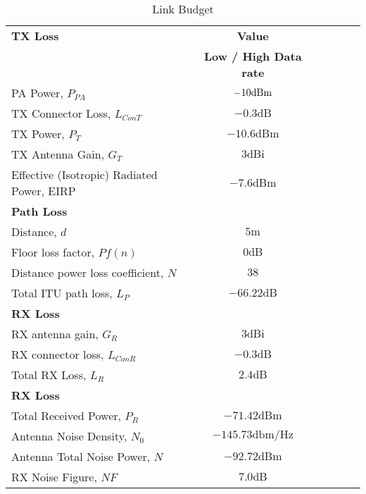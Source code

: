 \begin{table}[htbp]
  \centering
  \caption{Link Budget}
    \begin{tabular}{lccccr}
    \rowcolor[rgb]{ 0,  0,  0} \textcolor[rgb]{ 1,  1,  1}{\textbf{TX Loss}}	& \textcolor[rgb]{ 1,  1,  1}{\textbf{Value}} 		\\
    \rowcolor[rgb]{ 0,  0,  0} \textcolor[rgb]{ 1,  1,  1}{} & \textcolor[rgb]{ 1,  1,  1}{\textbf{Low / High Data rate}} 		\\
    PA Power, $P_{PA}$ 						& $-10 \text{dBm}$										\\
    TX Connector Loss, $L_{ConT}$  				& $-0.3 \text{dB}$ 											\\
    TX Power, $P_T$ 							& $-10.6 \text{dBm}$											\\
    TX Antenna Gain, $G_T$ 					& $3 \text{dBi}$ 											\\
    Effective (Isotropic) Radiated Power, EIRP  		& $-7.6 \text{dBm}$										\\
    
    \rowcolor[rgb]{ 0,  0,  0} \textcolor[rgb]{ 1,  1,  1}{\textbf{Path Loss}}
    & \textcolor[rgb]{ 1,  1,  1}{\textbf{}} 															\\
    Distance, $d$  							& $5 \text{m}$ 											\\
    Floor loss factor, $Pf(n)$ 					& $0 \text{dB}$											\\
    Distance power loss coefficient, $N$ 			& $38$ 												\\
    Total ITU path loss, $L_P$ 					& $-66.22 \text{dB}$										\\
    
    \rowcolor[rgb]{ 0,  0,  0} \textcolor[rgb]{ 1,  1,  1}{\textbf{RX Loss}}	& \textcolor[rgb]{ 1,  1,  1}{\textbf{}} 			\\
    RX antenna gain, $G_R$					& $3 \text{dBi}$ 											\\
    RX connector loss, $L_{ConR}$ 				& $-0.3 \text{dB}$ 											\\
    Total RX Loss, $L_R$						& $2.4 \text{dB}$											\\
    
    \rowcolor[rgb]{ 0,  0,  0} \textcolor[rgb]{ 1,  1,  1}{\textbf{RX Loss}}	& \textcolor[rgb]{ 1,  1,  1}{\textbf{}} 			\\
    Total Received Power, $P_R$ 				& $-71.42 \text{dBm}$										\\
    Antenna Noise Density, $N_0$ 				& $-145.73 \text{dbm/Hz}$								\\
    Antenna Total Noise Power, $N$   				& $-92.72 \text{dBm}$										\\
    RX Noise Figure, $NF$ 					& $7.0 \text{dB}$									\\
        

\end{tabular}
\end{table}
